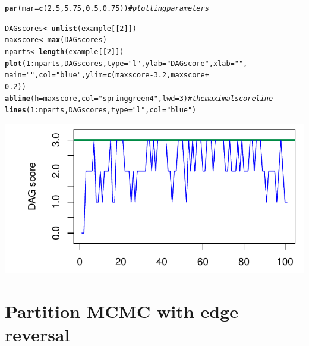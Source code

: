 \documentclass[a4paper]{article}\usepackage[]{graphicx}\usepackage[]{color}
\makeatletter
\def\maxwidth{ %
  \ifdim\Gin@nat@width>\linewidth
    \linewidth
  \else
    \Gin@nat@width
  \fi
}
\newcommand{\hlnum}[1]{\textcolor[rgb]{0.686,0.059,0.569}{#1}}%
\newcommand{\hlstr}[1]{\textcolor[rgb]{0.192,0.494,0.8}{#1}}%
\newcommand{\hlcom}[1]{\textcolor[rgb]{0.678,0.584,0.686}{\textit{#1}}}%
\newcommand{\hlopt}[1]{\textcolor[rgb]{0,0,0}{#1}}%
\newcommand{\hlstd}[1]{\textcolor[rgb]{0.345,0.345,0.345}{#1}}%
\newcommand{\hlkwb}[1]{\textcolor[rgb]{0.69,0.353,0.396}{#1}}%
\newcommand{\hlkwc}[1]{\textcolor[rgb]{0.333,0.667,0.333}{#1}}%
\newcommand{\hlkwd}[1]{\textcolor[rgb]{0.737,0.353,0.396}{\textbf{#1}}}%
\newenvironment{kframe}{%
 \def\at@end@of@kframe{}%
 \ifinner\ifhmode%
  \def\at@end@of@kframe{\end{minipage}}%
  \begin{minipage}{\columnwidth}%
 \fi\fi%
 \def\FrameCommand##1{\hskip\@totalleftmargin \hskip-\fboxsep
 \colorbox{shadecolor}{##1}\hskip-\fboxsep
     \hskip-\linewidth \hskip-\@totalleftmargin \hskip\columnwidth}%
 \MakeFramed {\advance\hsize-\width
   \@totalleftmargin\z@ \linewidth\hsize
   \@setminipage}}%
 {\par\unskip\endMakeFramed%
 \at@end@of@kframe}
\newenvironment{knitrout}{}{} %
\makeatother
\begin{document}
\begin{knitrout}
\color{fgcolor}\begin{kframe}
\begin{alltt}
\hlkwd{par}\hlstd{(}\hlkwc{mar} \hlstd{=} \hlkwd{c}\hlstd{(}\hlnum{2.5}\hlstd{,} \hlnum{5.75}\hlstd{,} \hlnum{0.5}\hlstd{,} \hlnum{0.75}\hlstd{))}  \hlcom{# plotting parameters}

\hlstd{DAGscores} \hlkwb{<-} \hlkwd{unlist}\hlstd{(example[[}\hlnum{2}\hlstd{]])}
\hlstd{maxscore} \hlkwb{<-} \hlkwd{max}\hlstd{(DAGscores)}
\hlstd{nparts} \hlkwb{<-} \hlkwd{length}\hlstd{(example[[}\hlnum{2}\hlstd{]])}
\hlkwd{plot}\hlstd{(}\hlnum{1}\hlopt{:}\hlstd{nparts, DAGscores,} \hlkwc{type} \hlstd{=} \hlstr{"l"}\hlstd{,} \hlkwc{ylab} \hlstd{=} \hlstr{"DAG score"}\hlstd{,} \hlkwc{xlab} \hlstd{=} \hlstr{""}\hlstd{,}
    \hlkwc{main} \hlstd{=} \hlstr{""}\hlstd{,} \hlkwc{col} \hlstd{=} \hlstr{"blue"}\hlstd{,} \hlkwc{ylim} \hlstd{=} \hlkwd{c}\hlstd{(maxscore} \hlopt{-} \hlnum{3.2}\hlstd{, maxscore} \hlopt{+}
        \hlnum{0.2}\hlstd{))}
\hlkwd{abline}\hlstd{(}\hlkwc{h} \hlstd{= maxscore,} \hlkwc{col} \hlstd{=} \hlstr{"springgreen4"}\hlstd{,} \hlkwc{lwd} \hlstd{=} \hlnum{3}\hlstd{)}  \hlcom{# the maximal score line}
\hlkwd{lines}\hlstd{(}\hlnum{1}\hlopt{:}\hlstd{nparts, DAGscores,} \hlkwc{type} \hlstd{=} \hlstr{"l"}\hlstd{,} \hlkwc{col} \hlstd{=} \hlstr{"blue"}\hlstd{)}
\end{alltt}
\end{kframe}

{\centering \includegraphics[width=\maxwidth]{figure/minimal-unnamed-chunk-21-1} 

}



\end{knitrout}

\section{Partition MCMC with edge reversal}
\end{document}
